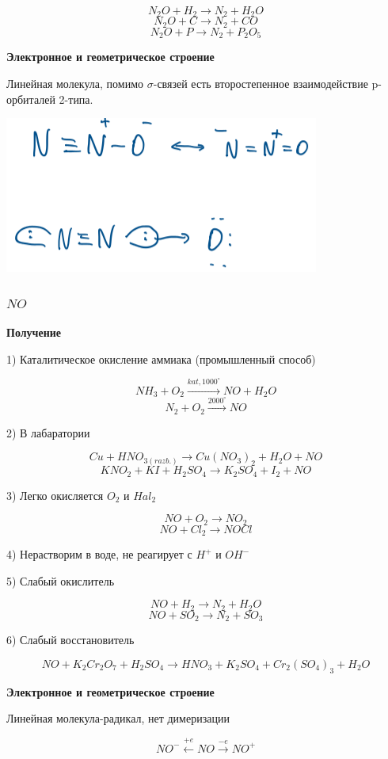$$N_2O + H_2 \rightarrow N_2 + H_2O$$
$$N_2O + C \rightarrow N_2 + CO$$
$$N_2O + P \rightarrow N_2 + P_2O_5$$

\textbf{Электронное и геометрическое строение}

Линейная молекула, помимо $\sigma$-связей есть второстепенное взаимодействие p-орбиталей 2-типа.

\includegraphics{images/8v7.png}

\subsubsection*{$NO$}

\textbf{Получение}

1) Каталитическое окисление аммиака (промышленный способ)

$$NH_3 + O_2 \xrightarrow{kat, 1000^{\circ}} NO + H_2O$$
$$N_2 + O_2 \xrightarrow{2000^{\circ}} NO$$

2) В лабаратории

$$ Cu + HNO_{3(razb.)}\rightarrow Cu(NO_3)_2 + H_2O + NO$$
$$KNO_2 + KI + H_2SO_4 \rightarrow K_2SO_4 + I_2 + NO$$

3) Легко окисляется $O_2$ и $Hal_2$

$$NO + O_2 \rightarrow NO_2$$
$$NO + Cl_2 \rightarrow NOCl$$

4) Нерастворим в воде, не реагирует с $H^+$ и $OH^-$

5) Слабый окислитель

$$NO + H_2 \rightarrow N_2 + H_2O$$
$$NO + SO_2 \rightarrow N_2 + SO_3$$

6) Слабый восстановитель

$$NO + K_2Cr_2O_7 + H_2SO_4 \rightarrow HNO_3 + K_2SO_4 + Cr_2(SO_4)_3 + H_2O$$

\textbf{Электронное и геометрическое строение}

Линейная молекула-радикал, нет димеризации

$$NO^- \xleftarrow{+e} NO \xrightarrow{-e}  NO^+$$

